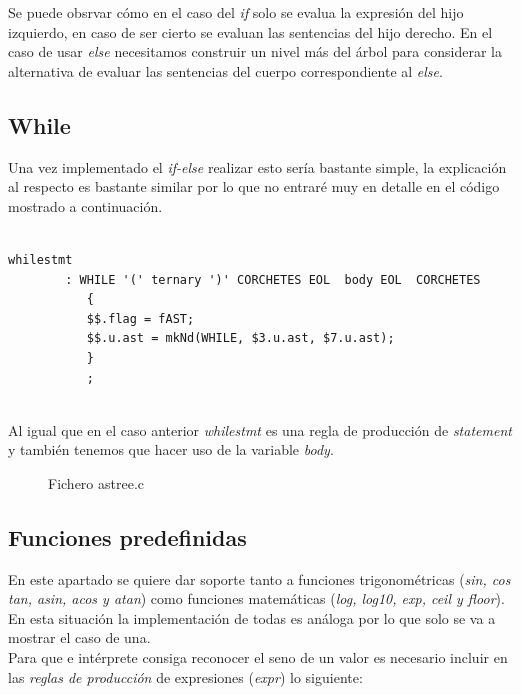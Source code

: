 \documentclass[11pt]{article}
\begin{document}
\noindent Se puede obsrvar cómo en el caso del \textit{if} solo se evalua la expresión del hijo izquierdo, en caso de ser cierto se evaluan las sentencias del hijo derecho. En el caso de usar \textit{else} necesitamos construir un  nivel más del árbol para considerar la alternativa de evaluar las sentencias del cuerpo correspondiente al \textit{else}.

\subsection{While}

\noindent Una vez implementado el \textit{if-else} realizar esto sería bastante simple, la explicación al respecto es bastante similar por lo que no entraré muy en detalle en el código mostrado a continuación.

\begin{verbatim}

whilestmt
        : WHILE '(' ternary ')' CORCHETES EOL  body EOL  CORCHETES
           {
           $$.flag = fAST;
           $$.u.ast = mkNd(WHILE, $3.u.ast, $7.u.ast);
           }
           ;
           
\end{verbatim}

\noindent Al igual que en el caso anterior \textit{whilestmt} es una regla de producción de \textit{statement} y también tenemos que hacer uso de la variable \textit{body}.

\begin{figure}[H]
  \centering
  \caption{Fichero astree.c}
\end{figure}


\subsection{Funciones predefinidas}

\noindent En este apartado se quiere dar soporte tanto a funciones trigonométricas (\textit{sin, cos tan, asin, acos y atan}) como funciones matemáticas (\textit{log, log10, exp, ceil y floor}). En esta situación la implementación de todas es análoga por lo que solo se va a mostrar el caso de una.\\
Para que e intérprete consiga reconocer el seno de un valor es necesario incluir en las \textit{reglas de producción} de expresiones (\textit{expr}) lo siguiente: 
\end{document}
